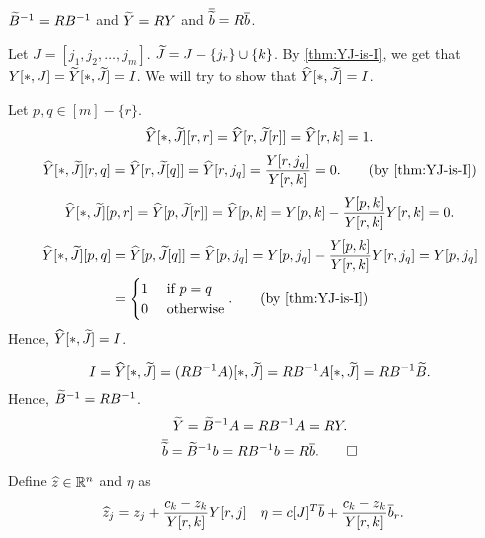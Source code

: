 \begin{lemma}
\label{thm:upd-Y}
$\widetilde{B}^{-1} = RB^{-1}$ and $\widetilde{Y} = RY$ and $\overline{\widetilde{b}} = R\overline{b}$.
\end{lemma}
\begin{longProof}
Let $J = [j_1, j_2, \ldots, j_m]$. $\widetilde{J} = J - \{j_r\} \cup \{k\}$.
By \cref{thm:YJ-is-I}, we get that $Y[*,J] = \widetilde{Y}[*,\widetilde{J}] = I$.
We will try to show that $\widehat{Y}[*,\widetilde{J}] = I$.

Let $p, q \in [m] - \{r\}$.
\[ \widehat{Y}[*,\widetilde{J}][r,r] = \widehat{Y}[r,\widetilde{J}[r]] = \widehat{Y}[r,k] = 1. \]
\[ \Yhat[*,\Jtild][r,q] = \Yhat[r,\Jtild[q]] = \Yhat[r,j_q] = \frac{Y[r,j_q]}{Y[r,k]} = 0.
    \tag{by \cref{thm:YJ-is-I}} \]
\[ \widehat{Y}[*,\widetilde{J}][p,r] = \widehat{Y}[p,\widetilde{J}[r]] = \widehat{Y}[p,k]
    = Y[p,k] - \frac{Y[p,k]}{Y[r,k]}Y[r,k] = 0. \]
\begin{align*}
\Yhat[*,\Jtild][p,q] &= \Yhat[p,\Jtild[q]] = \Yhat[p,j_q]
= Y[p,j_q] - \frac{Y[p,k]}{Y[r,k]}Y[r,j_q] = Y[p,j_q]
\\ &= \begin{cases}1 & \textrm{ if } p = q \\ 0 & \textrm{ otherwise}\end{cases}.
\tag{by \cref{thm:YJ-is-I}}
\end{align*}
Hence, $\widehat{Y}[*,\widetilde{J}] = I$.

\[ I = \widehat{Y}[*,\widetilde{J}] = (RB^{-1}A)[*,\widetilde{J}] = RB^{-1}A[*,\widetilde{J}] = RB^{-1}\widetilde{B}. \]
Hence, $\widetilde{B}^{-1} = RB^{-1}$.
\[ \widetilde{Y} = \widetilde{B}^{-1}A = RB^{-1}A = RY. \]
\[ \overline{\widetilde{b}} = \widetilde{B}^{-1}b = RB^{-1}b = R\overline{b}. \qedhere \]
\end{longProof}

Define $\widehat{z} \in \mathbb{R}^n$ and $\eta$ as
\begin{align*}
\widehat{z}_j &= z_j + \frac{c_k - z_k}{Y[r,k]} Y[r,j]
& \eta &= c[J]^T\overline{b} + \frac{c_k - z_k}{Y[r, k]}\overline{b}_r.
\end{align*}

